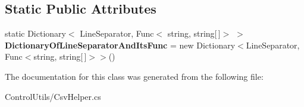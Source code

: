 \subsection*{Static Public Attributes}
\begin{DoxyCompactItemize}
\item 
static Dictionary$<$ Line\+Separator, Func$<$ string, string\mbox{[}$\,$\mbox{]}$>$ $>$ {\bfseries Dictionary\+Of\+Line\+Separator\+And\+Its\+Func} = new Dictionary$<$Line\+Separator, Func$<$string, string\mbox{[}$\,$\mbox{]}$>$$>$()\hypertarget{class_power_system_planning_wpf_app_1_1_control_utils_1_1_csv_helper_a857e4da4f229926717b5fa8f28fab105}{}\label{class_power_system_planning_wpf_app_1_1_control_utils_1_1_csv_helper_a857e4da4f229926717b5fa8f28fab105}

\end{DoxyCompactItemize}


The documentation for this class was generated from the following file\+:\begin{DoxyCompactItemize}
\item 
Control\+Utils/Csv\+Helper.\+cs\end{DoxyCompactItemize}
